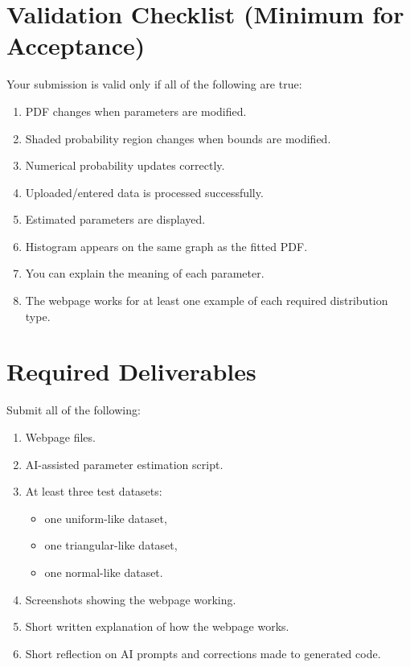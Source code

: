 	\section{Validation Checklist (Minimum for Acceptance)}
	Your submission is valid only if all of the following are true:
	\begin{enumerate}
		\item PDF changes when parameters are modified.
		\item Shaded probability region changes when bounds are modified.
		\item Numerical probability updates correctly.
		\item Uploaded/entered data is processed successfully.
		\item Estimated parameters are displayed.
		\item Histogram appears on the same graph as the fitted PDF.
		\item You can explain the meaning of each parameter.
		\item The webpage works for at least one example of each required distribution type.
	\end{enumerate}

	\section{Required Deliverables}
	Submit all of the following:
	\begin{enumerate}
		\item Webpage files.
		\item AI-assisted parameter estimation script.
		\item At least three test datasets:
		\begin{itemize}
			\item one uniform-like dataset,
			\item one triangular-like dataset,
			\item one normal-like dataset.
		\end{itemize}
		\item Screenshots showing the webpage working.
		\item Short written explanation of how the webpage works.
		\item Short reflection on AI prompts and corrections made to generated code.
	\end{enumerate}


